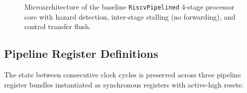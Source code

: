 \begin{figure}[htbp]
\caption{Microarchitecture of the baseline \texttt{RiscvPipelined} 4-stage processor core with hazard detection, inter-stage stalling (no forwarding), and control transfer flush.}\label{fig:riscv_4stage_pipeline}
\end{figure}

\subsection{Pipeline Register Definitions}

The state between consecutive clock cycles is preserved across three pipeline register bundles instantiated as synchronous registers with active-high resets:

